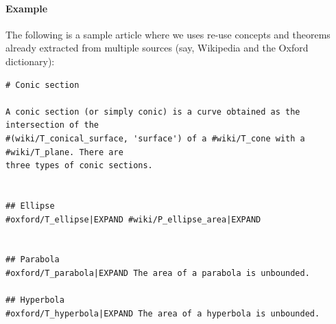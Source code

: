 \documentclass[a4paper]{article}
\begin{document}
\paragraph{Example}
The following is a sample article where we uses re-use concepts and theorems already extracted from multiple sources (say, Wikipedia and the Oxford dictionary):

\begin{verbatim}
# Conic section

A conic section (or simply conic) is a curve obtained as the intersection of the
#(wiki/T_conical_surface, 'surface') of a #wiki/T_cone with a #wiki/T_plane. There are
three types of conic sections.


## Ellipse
#oxford/T_ellipse|EXPAND #wiki/P_ellipse_area|EXPAND


## Parabola
#oxford/T_parabola|EXPAND The area of a parabola is unbounded.

## Hyperbola  
#oxford/T_hyperbola|EXPAND The area of a hyperbola is unbounded.

\end{verbatim}
\end{document}
